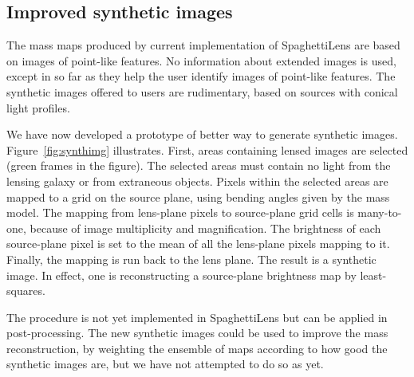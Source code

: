\documentclass[fleqn,usenatbib]{mnras}
\newcommand{\figref}[1]{\ref{fig:#1}}
\begin{document}
\subsection{Improved synthetic images}\label{subsec:sourcefit}

The mass maps produced by current implementation of SpaghettiLens are
based on images of point-like features.  No information about extended
images is used, except in so far as they help the user identify images
of point-like features.  The synthetic images offered to users are
rudimentary, based on sources with conical light profiles.

We have now developed a prototype of better way to generate synthetic
images.  Figure~\figref{synthimg} illustrates.  First, areas
containing lensed images are selected (green frames in the figure).
The selected areas must contain no light from the lensing galaxy or
from extraneous objects.  Pixels within the selected areas are mapped
to a grid on the source plane, using bending angles given by the mass
model.  The mapping from lens-plane pixels to source-plane grid cells
is many-to-one, because of image multiplicity and magnification.  The
brightness of each source-plane pixel is set to the mean of all the
lens-plane pixels mapping to it.  Finally, the mapping is run back to
the lens plane.  The result is a synthetic image.  In effect, one is
reconstructing a source-plane brightness map by least-squares.

The procedure is not yet implemented in SpaghettiLens but can be
applied in post-processing.  The new synthetic images could be used to
improve the mass reconstruction, by weighting the ensemble of maps
according to how good the synthetic images are, but we have not
attempted to do so as yet.
\end{document}
